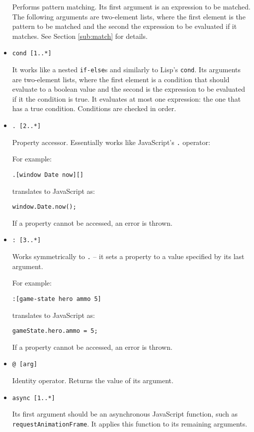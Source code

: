 \begin{itemize}
    Performs pattern matching. Its first argument is an expression to be matched. The following arguments are two-element lists, where the first element is the pattern to be matched and the second the expression to be evaluated if it matches. See Section \ref{sub:match} for details.
        
    \item \texttt{cond [1..*]}
    
    It works like a nested \texttt{if-else}s and similarly to Lisp's \texttt{cond}\cite[Section~5.3, Macro~COND]{common_lisp_hyperspec}. Its arguments are two-element lists, where the first element is a condition that should evaluate to a boolean value and the second is the expression to be evaluated if it the condition is true. It evaluates at most one expression: the one that has a true condition. Conditions are checked in order.
    
    \item \texttt{. [2..*]}
    
    Property accessor. Essentially works like JavaScript's \texttt{.} operator\cite{mdn_dot}:
    
    For example:
\begin{lstlisting}
.[window Date now][]
\end{lstlisting}
    
    translates to JavaScript as:
\begin{lstlisting}
window.Date.now();
\end{lstlisting}
    
    If a property cannot be accessed, an error is thrown.
    
    \item \texttt{: [3..*]}
    
    Works symmetrically to \texttt{.} -- it sets a property to a value specified by its last argument.
    
    For example:
\begin{lstlisting}
:[game-state hero ammo 5]
\end{lstlisting}
    
    translates to JavaScript as:
\begin{lstlisting}
gameState.hero.ammo = 5;
\end{lstlisting}
       
    If a property cannot be accessed, an error is thrown.
    
    \item \texttt{@ [arg]}
    
    Identity operator. Returns the value of its argument.
    
    \item \texttt{async [1..*]}
    
    Its first argument should be an asynchronous JavaScript function, such as \texttt{requestAnimationFrame}\cite{mdn_requestanimationframe}. It applies this function to its remaining arguments.
    
\end{itemize}

